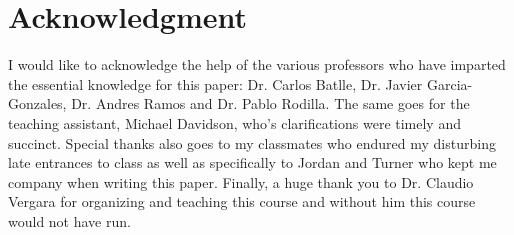\documentclass[journal]{IEEEtran}
\begin{document}
\appendices
\section*{Acknowledgment}
I would like to acknowledge the help of the various professors who have imparted the essential knowledge for this paper: Dr. Carlos Batlle, Dr. Javier Garcia-Gonzales, Dr. Andres Ramos and Dr. Pablo Rodilla. The same goes for the teaching assistant, Michael Davidson, who's clarifications were timely and succinct. Special thanks also goes to my classmates who endured my disturbing late entrances to class as well as specifically to Jordan and Turner who kept me company when writing this paper. Finally, a huge thank you to Dr. Claudio Vergara for organizing and teaching this course and without him this course would not have run.



\ifCLASSOPTIONcaptionsoff
  \newpage
\fi






%
%
\end{document}
